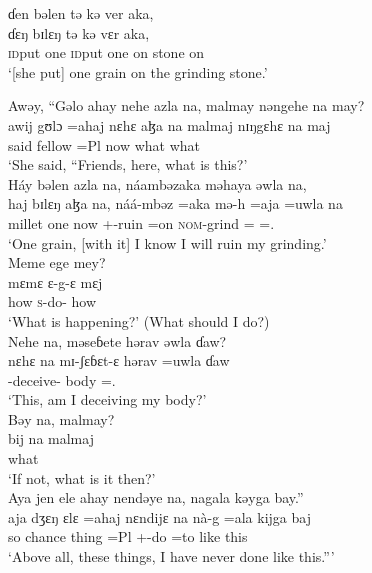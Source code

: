  \medskip
  ɗen  bəlen  tə  kə  ver  aka,\\
\gll ɗɛŋ        bɪlɛŋ  tə               kə  vɛr      aka,\\
 \textsc{id}put   one      {\textsc{id}put one}  on      stone  on\\
 \glt ‘[she put] one grain on the grinding stone.’\\
 \z
 
 \ea  Awəy,  “Gəlo  ahay  nehe  azla  na,  malmay  nəngehe  na  may?  \\
 \gll awij gʊlɔ  =ahaj nɛhɛ     aɮa     na  malmaj  nɪŋgɛhɛ  na  maj\\
 said  fellow  =Pl   {\DEM}    now   {\PSP}    what      {\DEM}      {\PSP}    what\\
 \glt ‘She said, “Friends, here, what is this?’\\
 
 \medskip
  Háy  bəlen  azla  na, náambəzaka  məhaya  əwla  na,\\
 \gll haj    bɪlɛŋ   aɮa   na,  náá-mbəz  =aka   mə-h      =aja    =uwla   na\\
 millet   one        now   {\PSP}  {\oneS}+{\POT}-ruin  =on  \textsc{nom}{}-grind ={\PLU} ={\oneS}.{\POSS}  {\PSP}\\
 \glt ‘One grain, [with it] I know I will ruin my grinding.’\\
 
 \medskip
  Meme  ege  mey?\\
\gll  mɛmɛ   ɛ{}-g-ɛ      mɛj\\
 how       \textsc{s}-do-{\CL}  how\\
 \glt ‘What is happening?’ (What should I do?)\\
 
 \medskip
 Nehe  na,  məseɓete  hərav  əwla  ɗaw?\\
 \gll nɛhɛ  na mɪ-ʃɛɓɛt-ɛ    hərav  =uwla    ɗaw\\
 {\DEM}             {\PSP}  {\NOM}{}-deceive-{\CL}  body  ={\oneS}.{\POSS}  {\QUEST}\\
 \glt ‘This, am I deceiving my body?’ \\
 
 \medskip
 Bəy  na,  malmay? \\
 \gll bij  na malmaj\\
 {\NEG}        {\PSP}  what\\
 \glt ‘If not, what is it then?’\\
 
 \medskip
  Aya  jen  ele  ahay  nendəye  na, nagala  kəyga  bay.”    \\
 \gll aja   dʒɛŋ  ɛlɛ  =ahaj  nɛndijɛ na nà-g    =ala  kijga  baj \\
 so  chance  thing   =Pl       {\DEM}     {\PSP}  {\oneS}+{\PFV}-do  =to  {like this}  {\NEG}           \\
 \glt ‘Above all, these things, I have never done like this.”’\\
 \z
 
